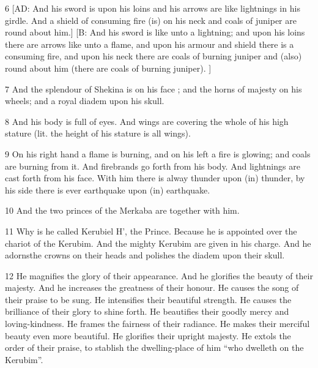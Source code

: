 \par 6 [AD: And his sword is upon his loins and his arrows are like lightnings in his girdle. And a shield of consuming fire (is) on his neck and coals of juniper are round about him.] [B: And his sword is like unto a lightning; and upon his loins there are arrows like unto a flame, and upon his armour and shield there is a consuming fire, and upon his neck there are coals of burning juniper and (also) round about him (there are coals of burning juniper). ]

\par 7 And the splendour of Shekina is on his face ; and the horns of majesty on his wheels; and a royal diadem upon his skull. 

\par 8 And his body is full of eyes. And wings are covering the whole of his high stature (lit. the height of his stature is all wings). 

\par 9 On his right hand a flame is burning, and on his left a fire is glowing; and coals are burning from it. And firebrands go forth from his body. And lightnings are cast forth from his face. With him there is alway thunder upon (in) thunder, by his side there is ever earthquake upon (in) earthquake. 

\par 10 And the two princes of the Merkaba are together with him. 

\par 11 Why is he called Kerubiel H', the Prince. Because he is appointed over the chariot of the Kerubim. And the mighty Kerubim are given in his charge. And he adornsthe crowns on their heads and polishes the diadem upon their skull. 

\par 12 He magnifies the glory of their appearance. And he glorifies the beauty of their majesty. And he increases the greatness of their honour. He causes the song of their praise to be sung. He intensifies their beautiful strength. He causes the brilliance of their glory to shine forth. He beautifies their goodly mercy and loving-kindness. He frames the fairness of their radiance. He makes their merciful beauty even more beautiful. He glorifies their upright majesty. He extols the order of their praise, to stablish the dwelling-place of him “who dwelleth on the Kerubim”. 

